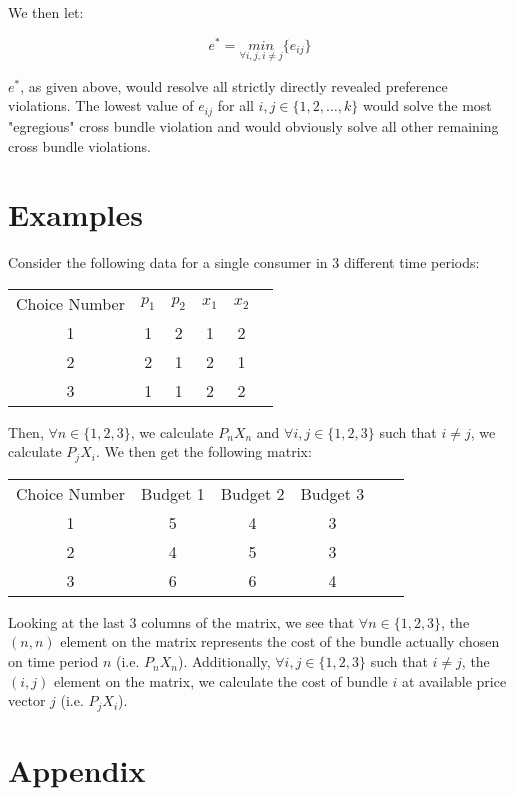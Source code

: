 \documentclass{article} %
\begin{document}
We then let:

$$e^{*}=\underset{\forall i,j, i\not=j}{min}\{e_{ij}\}$$

$e^{*}$, as given above, would resolve all strictly directly revealed preference violations. The lowest value of $e_{ij}$ for all $i,j\in\{1,2,\ldots,k\}$ would solve the most "egregious" cross bundle violation and would obviously solve all other remaining cross bundle violations.

\section{Examples}

Consider the following data for a single consumer in 3 different time periods:

\begin{center}
\begin{tabular}{ cccccc } 
Choice Number & $p_{1}$ & $p_{2}$ & $x_{1}$ & $x_{2}$ \\
1&1&2&1&2 \\
2&2&1&2&1 \\
3&1&1&2&2
\end{tabular}
\end{center}

Then, $\forall n\in\{1,2,3\}$, we calculate $P_{n}X_{n}$ and $\forall i,j\in\{1,2,3\}$ such that $i\not=j$, we calculate $P_{j}X_{i}$. We then get the following matrix:

\begin{center}
\begin{tabular}{ cccccc } 
Choice Number & Budget 1 & Budget 2 & Budget 3 \\
1&5&4&3 \\
2&4&5&3 \\
3&6&6&4
\end{tabular}
\end{center}

Looking at the last 3 columns of the matrix, we see that $\forall n\in\{1,2,3\}$, the $(n,n)$ element on the matrix represents the cost of the bundle actually chosen on time period $n$ (i.e. $P_{n}X_{n}$). Additionally, $\forall i,j\in\{1,2,3\}$ such that $i\not=j$, the $(i,j)$ element on the matrix, we calculate the cost of bundle $i$ at available price vector $j$ (i.e. $P_{j}X_{i}$).

\section{Appendix}
\end{document}
